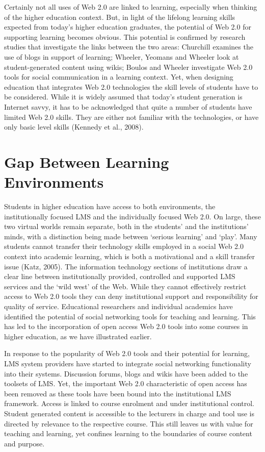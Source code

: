 Certainly not all uses of Web 2.0 are linked to learning, especially when
thinking of the higher education context. But, in light of the lifelong learning
skills expected from today’s higher education graduates, the potential of Web
2.0 for supporting learning becomes obvious. This potential is confirmed by
research studies that investigate the links between the two areas: Churchill
\citeyear{Churchill2009} examines the use of blogs in support of learning; Wheeler,
Yeomans and Wheeler \citeyear{Wheeler2008} look at student-generated content using
wikis; Boulos and Wheeler \citeyear{Boulos2007} investigate Web 2.0 tools for
social communication in a learning context. Yet, when designing education that
integrates Web 2.0 technologies the skill levels of students have to be
considered. While it is widely assumed that today’s student generation is
Internet savvy, it has to be acknowledged that quite a number of students have
limited Web 2.0 skills. They are either not familiar with the technologies, or
have only basic level skills (Kennedy et al., 2008).

\section{Gap Between Learning Environments}
Students in higher education have access to both environments, the
institutionally focused LMS and the individually focused Web 2.0. On large,
these two virtual worlds remain separate, both in the students’ and the
institutions’ minds, with a distinction being made between ‘serious learning’
and ‘play’.  Many students cannot transfer their technology skills employed in a
social Web 2.0 context into academic learning, which is both a motivational and
a skill transfer issue (Katz, 2005). The information technology sections of
institutions draw a clear line between institutionally provided, controlled and
supported LMS services and the ‘wild west’ of the Web. While they cannot
effectively restrict access to Web 2.0 tools they can deny institutional support
and responsibility for quality of service. Educational researchers and
individual academics have identified the potential of social networking tools
for teaching and learning. This has led to the incorporation of open access Web
2.0 tools into some courses in higher education, as we have illustrated earlier.

In response to the popularity of Web 2.0 tools and their potential for learning,
LMS system providers have started to integrate social networking functionality
into their systems. Discussion forums, blogs and wikis have been added to the
toolsets of LMS. Yet, the important Web 2.0 characteristic of open access has
been removed as these tools have been bound into the institutional LMS
framework. Access is linked to course enrolment and under institutional control.
Student generated content is accessible to the lecturers in charge and tool use
is directed by relevance to the respective course. This still leaves us with
value for teaching and learning, yet confines learning to the boundaries of
course content and purpose.

